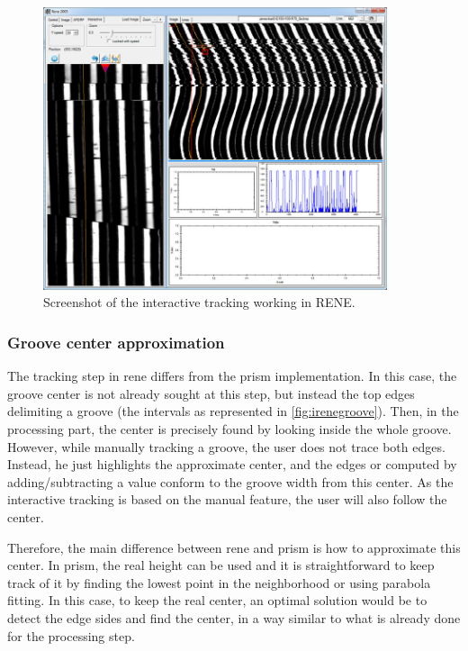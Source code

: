 \begin{figure}[!ht]
\centering
\includegraphics[width=0.9\textwidth]{images/int-tracking-rene}
\caption{Screenshot of the interactive tracking working in RENE.}
\label{fig:ireneintgui}
\end{figure}

\subsubsection{Groove center approximation}

The tracking step in \gls{rene} differs from the \gls{prism} implementation. In this case, the groove center is not already sought at this step, but instead the top edges delimiting a groove (the intervals as represented in \autoref{fig:irenegroove}). Then, in the processing part, the center is precisely found by looking inside the whole groove. However, while manually tracking a groove, the user does not trace both edges. Instead, he just highlights the approximate center, and the edges or computed by adding/subtracting a value conform to the groove width from this center. As the interactive tracking is based on the manual feature, the user will also follow the center.

Therefore, the main difference between \gls{rene} and \gls{prism} is how to approximate this center. In \gls{prism}, the real height can be used and it is straightforward to keep track of it by finding the lowest point in the neighborhood or using parabola fitting. In this case, to keep the real center, an optimal solution would be to detect the edge sides and find the center, in a way similar to what is already done for the processing step.

